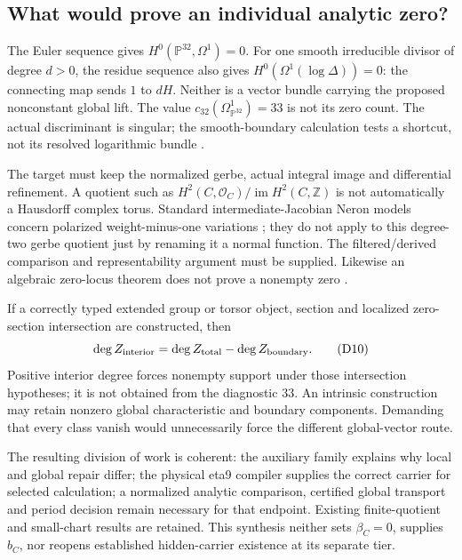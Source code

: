 \documentclass[11pt,a4paper]{article}
\begin{document}
\subsection{What would prove an individual analytic zero?}
\label{sec:deligne-zero-boundary}
The Euler sequence gives \(H^0(\mathbb P^{32},\Omega^1)=0\).
For one smooth irreducible divisor of degree \(d>0\), the residue
sequence also gives \(H^0(\Omega^1(\log\Delta))=0\): the connecting
map sends \(1\) to \(dH\). Neither is a vector bundle carrying the
proposed nonconstant global lift. The value
\(c_{32}(\Omega^1_{\mathbb P^{32}})=33\) is not its zero count.
The actual discriminant is singular; the smooth-boundary
calculation tests a shortcut, not its resolved logarithmic bundle
\cite{PreprojectionDeligneCutset2026}.

The target must keep the normalized gerbe, actual integral image
and differential refinement. A quotient such as
\(H^2(C,\mathcal O_C)/\operatorname{im}H^2(C,\mathbb Z)\) is not
automatically a Hausdorff complex torus.
Standard intermediate-Jacobian Neron models concern polarized
weight-minus-one variations \cite{SchnellNeron2010};
they do not apply to this degree-two gerbe quotient just by
renaming it a normal function. The filtered/derived comparison
and representability argument must be supplied. Likewise an
algebraic zero-locus theorem does not prove a nonempty zero
\cite{BrosnanPearlstein2009}.

If a correctly typed extended group or torsor object, section and
localized zero-section intersection are constructed, then
\[
 \deg Z_{\rm interior}
       =\deg Z_{\rm total}-\deg Z_{\rm boundary}.
 \tag{D10}\label{eq:deligne-zero-degree}
\]
Positive interior degree forces nonempty support under those
intersection hypotheses; it is not obtained from the diagnostic 33.
An intrinsic construction may retain nonzero global characteristic
and boundary components. Demanding that every class vanish would
unnecessarily force the different global-vector route.

The resulting division of work is coherent: the auxiliary family
explains why local and global repair differ; the physical eta9
compiler supplies the correct carrier for selected calculation;
a normalized analytic comparison, certified global transport and
period decision remain necessary for that endpoint. Existing
finite-quotient and small-chart results are retained. This
synthesis neither sets \(\beta_C=0\), supplies \(b_C\), nor reopens
established hidden-carrier existence at its separate tier.
\end{document}
